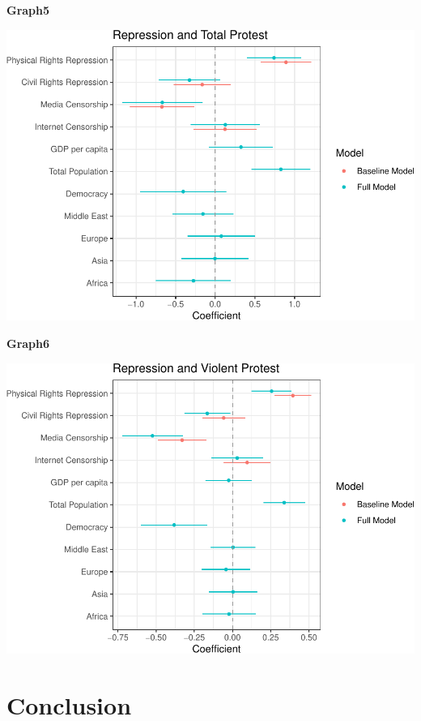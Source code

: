 \documentclass[11pt,]{article}
\begin{document}
\begin{center}
    \textbf{Graph5}
\end{center}

\includegraphics{replication_files/figure-latex/unnamed-chunk-7-1.pdf}

\begin{center}
    \textbf{Graph6}
\end{center}

\includegraphics{replication_files/figure-latex/unnamed-chunk-8-1.pdf}

\section{Conclusion}
\end{document}
